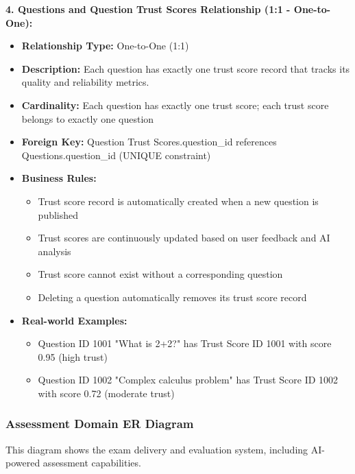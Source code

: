 \documentclass[12pt,a4paper,oneside]{book}
\begin{document}
\textbf{4. Questions and Question Trust Scores Relationship (1:1 - One-to-One):}
\begin{itemize}
    \item \textbf{Relationship Type:} One-to-One (1:1)
    \item \textbf{Description:} Each question has exactly one trust score record that tracks its quality and reliability metrics.
    \item \textbf{Cardinality:} Each question has exactly one trust score; each trust score belongs to exactly one question
    \item \textbf{Foreign Key:} Question Trust Scores.question\_id references Questions.question\_id (UNIQUE constraint)
    \item \textbf{Business Rules:}
        \begin{itemize}
            \item Trust score record is automatically created when a new question is published
            \item Trust scores are continuously updated based on user feedback and AI analysis
            \item Trust score cannot exist without a corresponding question
            \item Deleting a question automatically removes its trust score record
        \end{itemize}
    \item \textbf{Real-world Examples:}
        \begin{itemize}
            \item Question ID 1001 "What is 2+2?" has Trust Score ID 1001 with score 0.95 (high trust)
            \item Question ID 1002 "Complex calculus problem" has Trust Score ID 1002 with score 0.72 (moderate trust)
        \end{itemize}
\end{itemize}

\subsubsection{Assessment Domain ER Diagram}

This diagram shows the exam delivery and evaluation system, including AI-powered assessment capabilities.
\end{document}
